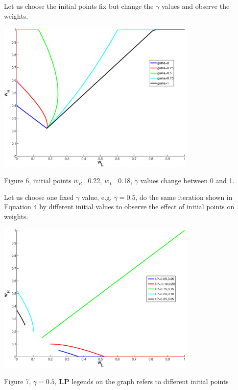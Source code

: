 \documentclass{article}
\begin{document}
Let us choose the initial points fix but change the $\gamma$ values and observe the weights.
\begin{center}
\includegraphics[width=\textwidth, height=75mm]{dif_gama.eps}
\begin{footnotesize}
 Figure 6, initial points $w_R$=0.22, $w_L$=0.18, $\gamma$ values change between 0 and 1.
\end{footnotesize}
\end{center}

Let us choose one fixed $\gamma$ value, e.g. $\gamma=0.5$, do the same iteration shown in Equation 4 by different initial values to observe the effect of initial points on weights.

\begin{center}
\includegraphics[width=\textwidth,  height=75mm]{5_initial.eps}
\begin{footnotesize}
 Figure 7, $\gamma=0.5$, \textbf{I.P} legends on the graph refers to different initial points
\end{footnotesize}
\end{center}
\end{document}
